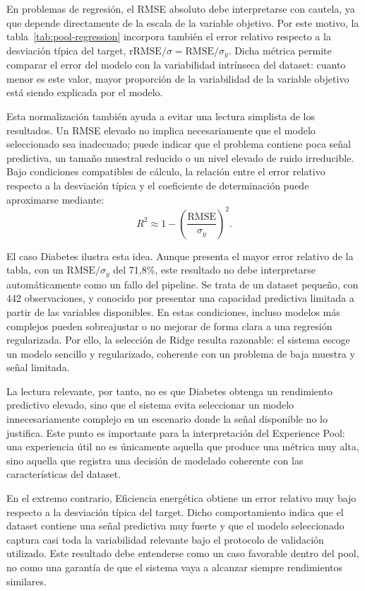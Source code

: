 \documentclass[12pt,a4paper]{article}
\theoremstyle{plain}
\begin{document}
En problemas de regresión, el RMSE absoluto debe interpretarse con cautela, ya que depende directamente de la escala de la variable objetivo. Por este motivo, la tabla~\ref{tab:pool-regression} incorpora también el error relativo respecto a la desviación típica del target, $\text{rRMSE}/\sigma = \text{RMSE}/\sigma_y$. Dicha métrica permite comparar el error del modelo con la variabilidad intrínseca del dataset: cuanto menor es este valor, mayor proporción de la variabilidad de la variable objetivo está siendo explicada por el modelo.

Esta normalización también ayuda a evitar una lectura simplista de los resultados. Un RMSE elevado no implica necesariamente que el modelo seleccionado sea inadecuado; puede indicar que el problema contiene poca señal predictiva, un tamaño muestral reducido o un nivel elevado de ruido irreducible. Bajo condiciones compatibles de cálculo, la relación entre el error relativo respecto a la desviación típica y el coeficiente de determinación puede aproximarse mediante:
\begin{equation*}
R^2 \approx 1 - \left(\frac{\text{RMSE}}{\sigma_y}\right)^2.
\end{equation*}

El caso Diabetes ilustra esta idea. Aunque presenta el mayor error relativo de la tabla, con un $\text{RMSE}/\sigma_y$ del 71,8\%, este resultado no debe interpretarse automáticamente como un fallo del pipeline. Se trata de un dataset pequeño, con 442 observaciones, y conocido por presentar una capacidad predictiva limitada a partir de las variables disponibles. En estas condiciones, incluso modelos más complejos pueden sobreajustar o no mejorar de forma clara a una regresión regularizada. Por ello, la selección de Ridge resulta razonable: el sistema escoge un modelo sencillo y regularizado, coherente con un problema de baja muestra y señal limitada.

La lectura relevante, por tanto, no es que Diabetes obtenga un rendimiento predictivo elevado, sino que el sistema evita seleccionar un modelo innecesariamente complejo en un escenario donde la señal disponible no lo justifica. Este punto es importante para la interpretación del Experience Pool: una experiencia útil no es únicamente aquella que produce una métrica muy alta, sino aquella que registra una decisión de modelado coherente con las características del dataset.

En el extremo contrario, Eficiencia energética obtiene un error relativo muy bajo respecto a la desviación típica del target. Dicho comportamiento indica que el dataset contiene una señal predictiva muy fuerte y que el modelo seleccionado captura casi toda la variabilidad relevante bajo el protocolo de validación utilizado. Este resultado debe entenderse como un caso favorable dentro del pool, no como una garantía de que el sistema vaya a alcanzar siempre rendimientos similares.
\end{document}
